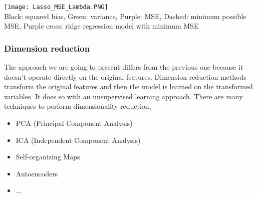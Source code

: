 \documentclass[main.tex]{subfiles}
\begin{document}
\begin{center}
   \texttt{[image: Lasso\_MSE\_Lambda.PNG]} \\
   Black: squared bias, Green: variance, Purple: MSE, Dashed: minimum possible MSE, Purple cross: ridge regression model with minimum MSE
\end{center}

\subsubsection{Dimension reduction}
The approach we are going to present differs from the previous one because it doesn't operate directly on the original features. Dimension reduction methods transform the original features and then the model is learned on the transformed variables. It does so with an unsupervised learning approach. There are many techniques to perform dimensionality reduction,
\begin{itemize}
    \item PCA (Principal Component Analysis)
    \item ICA (Independent Component Analysis)
    \item Self-organizing Maps
    \item Autoencoders
    \item ...
\end{itemize}
\end{document}
